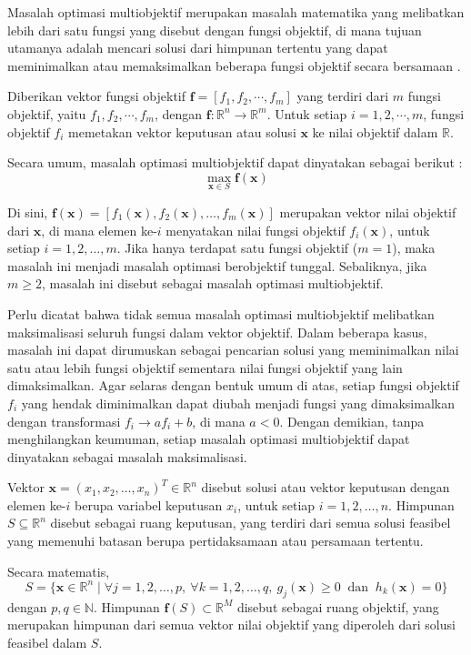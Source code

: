 Masalah optimasi multiobjektif merupakan masalah matematika yang melibatkan lebih dari satu fungsi yang disebut dengan fungsi objektif, di mana tujuan utamanya adalah mencari solusi dari himpunan tertentu yang dapat meminimalkan atau memaksimalkan beberapa fungsi objektif secara bersamaan \citep{CoelloLamontVeldhuizen2007}. 

Diberikan vektor fungsi objektif $\mathbf{f} = [f_1 , f_2 , \cdots , f_m]$ yang terdiri dari $m$ fungsi objektif, yaitu $f_1, f_2, \cdots, f_m$, dengan $\mathbf{f}:\mathbb{R}^n \rightarrow \mathbb{R}^m$. Untuk setiap $i = 1,2,\cdots,m$, fungsi objektif $f_i$ memetakan vektor keputusan atau solusi $\mathbf{x}$ ke nilai objektif dalam $\mathbb{R}$.

Secara umum, masalah optimasi multiobjektif dapat dinyatakan sebagai berikut \citep{CoelloLamontVeldhuizen2007}:
\[
\max_{\mathbf{x} \in S} \mathbf{f}(\mathbf{x})
\]

Di sini,  $\mathbf{f}(\mathbf{x}) = [f_1(\mathbf{x}), f_2(\mathbf{x}), \dots,f_m(\mathbf{x})]$ merupakan vektor nilai objektif dari $\mathbf{x}$, di mana elemen ke-$i$ menyatakan nilai fungsi objektif $f_i(\mathbf{x})$, untuk setiap $i = 1, 2, \dots, m$. Jika hanya terdapat satu fungsi objektif ($m=1$), maka masalah ini menjadi masalah optimasi berobjektif tunggal. Sebaliknya, jika $m \geq 2$, masalah ini disebut sebagai masalah optimasi multiobjektif.

Perlu dicatat bahwa tidak semua masalah optimasi multiobjektif melibatkan maksimalisasi seluruh fungsi dalam vektor objektif. Dalam beberapa kasus, masalah ini dapat dirumuskan sebagai pencarian solusi yang meminimalkan nilai satu atau lebih fungsi objektif sementara nilai fungsi objektif yang lain dimaksimalkan. Agar selaras dengan bentuk umum di atas, setiap fungsi objektif $f_i$  yang hendak diminimalkan dapat diubah menjadi fungsi yang dimaksimalkan dengan transformasi $f_i \rightarrow af_i+b$, di mana $a < 0$. Dengan demikian, tanpa menghilangkan keumuman, setiap masalah optimasi multiobjektif dapat dinyatakan sebagai masalah maksimalisasi.

Vektor $\mathbf{x} = (x_1, x_2, \dots, x_n)^T \in \mathbb{R}^n$ disebut solusi atau vektor keputusan dengan elemen ke-$i$ berupa variabel keputusan $x_i$, untuk setiap $i = 1,2,\dots,n$. Himpunan $S \subseteq \mathbb{R}^n$ disebut sebagai ruang keputusan, yang terdiri dari semua solusi feasibel yang memenuhi batasan berupa pertidaksamaan atau persamaan tertentu. 

Secara matematis, 
\[
S = \{\mathbf{x} \in \mathbb{R}^n \mid \forall j = 1, 2, \dots, p,\ \forall k=1,2,\dots,q,\ g_j(\mathbf{x}) \geq 0\ \text{ dan }\ h_k(\mathbf{x})=0\}
\]
dengan $p, q \in \mathbb{N}$. Himpunan $\mathbf{f}(S) \subset \mathbb{R}^M$ disebut sebagai ruang objektif, yang merupakan himpunan dari semua vektor nilai objektif yang diperoleh dari solusi feasibel dalam $S$. 

